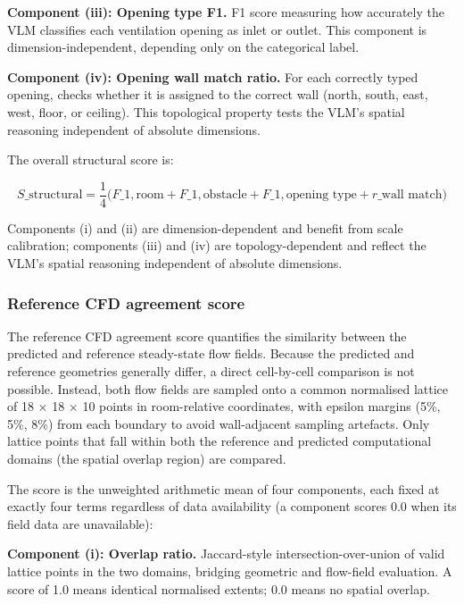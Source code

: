 \documentclass[preprint,12pt,number]{elsarticle}
\begin{document}
\textbf{Component (iii): Opening type F1.} F1 score measuring how accurately the VLM classifies each ventilation opening as inlet or outlet. This component is dimension-independent, depending only on the categorical label.

\textbf{Component (iv): Opening wall match ratio.} For each correctly typed opening, checks whether it is assigned to the correct wall (north, south, east, west, floor, or ceiling). This topological property tests the VLM's spatial reasoning independent of absolute dimensions.

The overall structural score is:

\begin{equation}
S\_\text{structural} = \frac{1}{4}\bigl(F\_{1,\text{room}} + F\_{1,\text{obstacle}} + F\_{1,\text{opening type}} + r\_\text{wall match}\bigr)
\label{eq:structural-score}
\end{equation}

Components (i) and (ii) are dimension-dependent and benefit from scale calibration; components (iii) and (iv) are topology-dependent and reflect the VLM's spatial reasoning independent of absolute dimensions.

\subsubsection{Reference CFD agreement score}


The reference CFD agreement score quantifies the similarity between the predicted and reference steady-state flow fields. Because the predicted and reference geometries generally differ, a direct cell-by-cell comparison is not possible. Instead, both flow fields are sampled onto a common normalised lattice of 18 $\times$ 18 $\times$ 10 points in room-relative coordinates, with epsilon margins (5\%, 5\%, 8\%) from each boundary to avoid wall-adjacent sampling artefacts. Only lattice points that fall within both the reference and predicted computational domains (the spatial overlap region) are compared.

The score is the unweighted arithmetic mean of four components, each fixed at exactly four terms regardless of data availability (a component scores 0.0 when its field data are unavailable):

\textbf{Component (i): Overlap ratio.} Jaccard-style intersection-over-union of valid lattice points in the two domains, bridging geometric and flow-field evaluation. A score of 1.0 means identical normalised extents; 0.0 means no spatial overlap.
\end{document}
